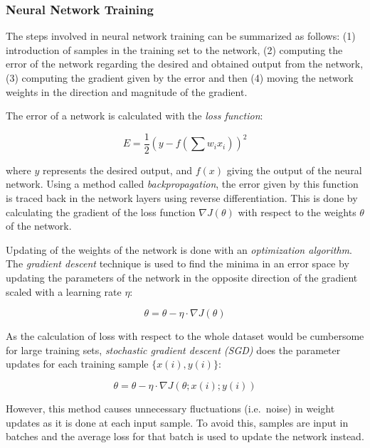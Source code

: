 \subsubsection*{Neural Network Training}
The steps involved in neural network training can be summarized as follows: (1) introduction of samples in the training set to the network, (2) computing the error of the network regarding the desired and obtained output from the network, (3) computing the gradient given by the error and then (4) moving the network weights in the direction and magnitude of the gradient. 

The error of a network is calculated with the \textit{loss function}:

\begin{equation}
    E = \frac { 1 } { 2 } \left( y - f \left( \sum w _ { i } x _ { i } \right) \right) ^ { 2 }
\end{equation}

where $y$ represents the desired output, and $f(x)$ giving the output of the neural network. Using a method called \textit{backpropagation}, the error given by this function is traced back in the network layers using reverse differentiation. This is done by calculating the gradient of the loss function $\nabla J ( \theta )$ with respect to the weights $ \theta $ of the network.

Updating of the weights of the network is done with an \textit{optimization algorithm}. The \textit{gradient descent} technique is used to find the minima in an error space by updating the parameters of the network in the opposite direction of the gradient scaled with a learning rate $\eta$:

\begin{equation}
 \theta =  \theta -  \eta \cdot \nabla J(  \theta )
\end{equation}

As the calculation of loss with respect to the whole dataset would be cumbersome for large training sets, \textit{stochastic gradient descent (SGD)} \citep{bengio_dl, sgd2} does the parameter updates for each training sample $\{ x ( i ) , y ( i ) \}$:

\begin{equation}
    \theta = \theta -  \eta \cdot  \nabla J ( \theta  ;  x ( i  ) ;  y  ( i ) )
\end{equation}

However, this method causes unnecessary fluctuations (i.e.~noise) in weight updates as it is done at each input sample. To avoid this, samples are input in batches and the average loss for that batch is used to update the network instead.

